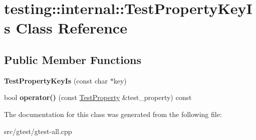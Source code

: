 \hypertarget{classtesting_1_1internal_1_1_test_property_key_is}{}\section{testing\+:\+:internal\+:\+:Test\+Property\+Key\+Is Class Reference}
\label{classtesting_1_1internal_1_1_test_property_key_is}
\subsection*{Public Member Functions}
\begin{DoxyCompactItemize}
\item 
\mbox{\label{classtesting_1_1internal_1_1_test_property_key_is_a072ed209442b28ef13041c12565552ab}} 
{\bfseries Test\+Property\+Key\+Is} (const char $\ast$key)
\item 
\mbox{\label{classtesting_1_1internal_1_1_test_property_key_is_abf5eb5bf22065e0614ffe36d093e885e}} 
bool {\bfseries operator()} (const \mbox{\hyperlink{classtesting_1_1_test_property}{Test\+Property}} \&test\+\_\+property) const
\end{DoxyCompactItemize}


The documentation for this class was generated from the following file\+:\begin{DoxyCompactItemize}
\item 
src/gtest/gtest-\/all.\+cpp\end{DoxyCompactItemize}
